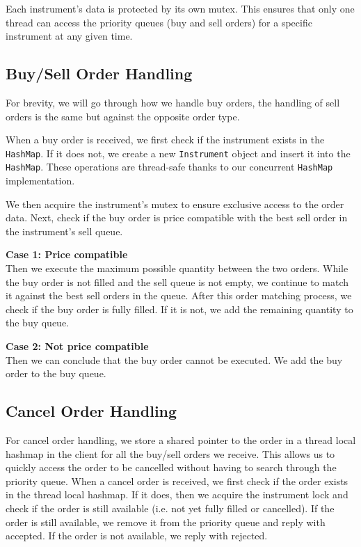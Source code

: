 \documentclass[11pt]{article}
\begin{document}
Each instrument's data is protected by its own mutex. This ensures that only one thread can access the priority queues (buy and sell orders) for a specific instrument at any given time.

\subsection{Buy/Sell Order Handling}\label{sub:Buy/Sell Order Handling} %

For brevity, we will go through how we handle buy orders, the handling of sell orders is the same
but against the opposite order type.

When a buy order is received, we first check if the instrument exists in the \texttt{HashMap}. If it
does not, we create a new \texttt{Instrument} object and insert it into the \texttt{HashMap}. These
operations are thread-safe thanks to our concurrent \texttt{HashMap} implementation.

We then acquire the instrument's mutex to ensure exclusive access to the order data. Next, check
if the buy order is price compatible with the best sell order in the instrument's sell queue.

\textbf{Case 1: Price compatible} \\
Then we execute the maximum possible quantity between the two orders. While the buy order is not
filled and the sell queue is not empty, we continue to match it against the best sell orders in the queue.
After this order matching process, we check if the buy order is fully filled. If it is not, we add
the remaining quantity to the buy queue.

\textbf{Case 2: Not price compatible} \\
Then we can conclude that the buy order cannot be executed. We add the buy order to the buy queue.


\subsection{Cancel Order Handling}\label{sub:Cancel Order Handling} %

For cancel order handling, we store a shared pointer to the order in a thread local hashmap in the
client for all the buy/sell orders we receive. This
allows us to quickly access the order to be cancelled without having to search through the priority
queue. When a cancel order is received, we first check if the order exists in the thread local
hashmap. If it does, then we acquire the instrument lock and check if the order is still available (i.e. not yet fully filled or
cancelled). If the order is still available, we remove it from the priority queue and reply with
accepted. If the order is not available, we reply with rejected.
\end{document}

